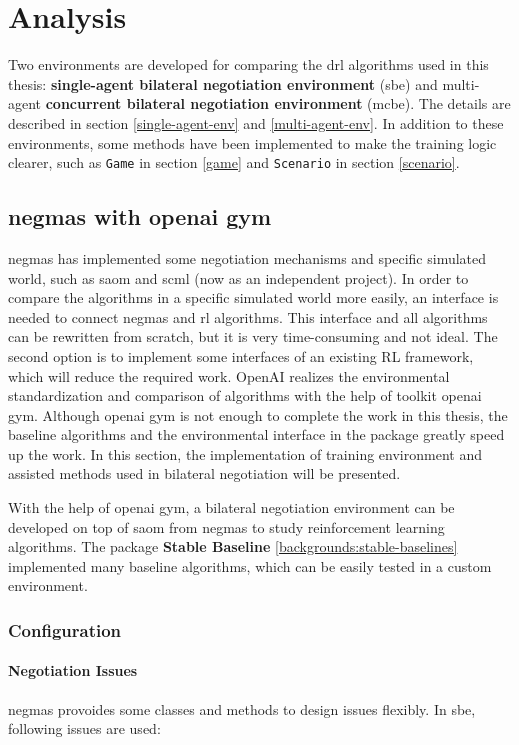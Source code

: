 \chapter{Analysis}
Two environments are developed for comparing the \gls{drl} algorithms used in this thesis: \textbf{single-agent bilateral negotiation environment} (\gls{sbe}) and multi-agent \textbf{concurrent bilateral negotiation environment} (\gls{mcbe}). The details are described in section \ref{single-agent-env} and \ref{multi-agent-env}. In addition to these environments, some methods have been implemented to make the training logic clearer, such as \texttt{Game} in section \ref{game} and \texttt{Scenario} in section \ref{scenario}.

\section{\gls{negmas} with \gls{openai gym}}
\gls{negmas} has implemented some negotiation mechanisms and specific simulated world, such as \gls{saom} and \gls{scml} (now as an independent project). In order to compare the algorithms in a specific simulated world more easily, an interface is needed to connect \gls{negmas} and \gls{rl} algorithms. This interface and all algorithms can be rewritten from scratch, but it is very time-consuming and not ideal. The second option is to implement some interfaces of an existing RL framework, which will reduce the required work. OpenAI realizes the environmental standardization and comparison of algorithms with the help of toolkit \gls{openai gym}\parencite{brockman2016openai}. Although \gls{openai gym} is not enough to complete the work in this thesis, the baseline algorithms and the environmental interface in the package greatly speed up the work. In this section, the implementation of training environment and assisted methods used in bilateral negotiation will be presented.

With the help of \gls{openai gym}, a bilateral negotiation environment can be developed on top of \gls{saom} from \gls{negmas} to study reinforcement learning algorithms. The package \textbf{Stable Baseline} \ref{backgrounds:stable-baselines} implemented many baseline algorithms, which can be easily tested in a custom environment.

\subsection{Configuration}
\subsubsection{Negotiation Issues}
\gls{negmas} provoides some classes and methods to design issues flexibly. In \gls{sbe}, following issues are used:
 
